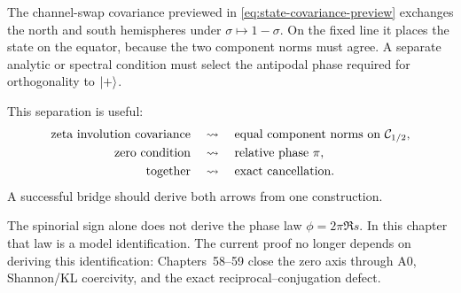 The channel-swap covariance previewed in \cref{eq:state-covariance-preview} exchanges the north and south hemispheres under $\sigma\mapsto1-\sigma$. On the fixed line it places the state on the equator, because the two component norms must agree. A separate analytic or spectral condition must select the antipodal phase required for orthogonality to $\lvert +\rangle$.

This separation is useful:
\begin{align*}
 \text{zeta involution covariance}&\quad\rightsquigarrow\quad\text{equal component norms on }\mathcal{C}_{1/2},\\
 \text{zero condition}&\quad\rightsquigarrow\quad\text{relative phase }\pi,\\
 \text{together}&\quad\rightsquigarrow\quad\text{exact cancellation}.
\end{align*}
A successful bridge should derive both arrows from one construction.

\begin{warning}
The spinorial sign alone does not derive the phase law $\phi=2\pi\Re s$. In this chapter that law is a model identification. The current proof no longer depends on deriving this identification: Chapters~58--59 close the zero axis through A0, Shannon/KL coercivity, and the exact reciprocal--conjugation defect.
\end{warning}


